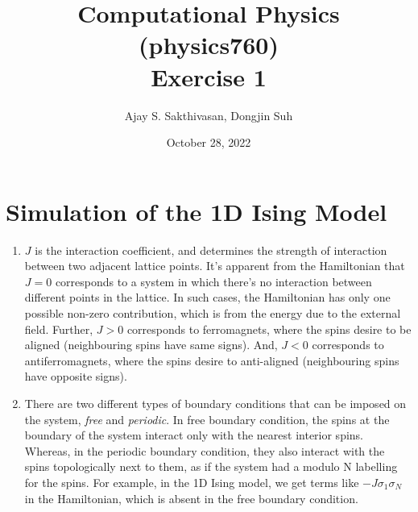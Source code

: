 \documentclass{article}
\title{Computational Physics (physics760) \\ Exercise 1}
\author{Ajay S. Sakthivasan, Dongjin Suh}
\date{October 28, 2022}
\begin{document}
\maketitle

\section{Simulation of the 1D Ising Model}
\begin{enumerate}
    \item $J$ is the interaction coefficient, and determines the strength of interaction between two adjacent lattice points. It's apparent from the Hamiltonian that $J = 0$ corresponds to a system in which there's no interaction between different points in the lattice. In such cases, the Hamiltonian has only one possible non-zero contribution, which is from the energy due to the external field. Further, $J>0$ corresponds to ferromagnets, where the spins desire to be aligned (neighbouring spins have same signs). And, $J<0$ corresponds to antiferromagnets, where the spins desire to anti-aligned (neighbouring spins have opposite signs).
    \item There are two different types of boundary conditions that can be imposed on the system, \textit{free} and \textit{periodic}. In free boundary condition, the spins at the boundary of the system interact only with the nearest interior spins. Whereas, in the periodic boundary condition, they also interact with the spins topologically next to them, as if the system had a modulo N labelling for the spins. For example, in the 1D Ising model, we get terms like $-J\sigma_1\sigma_N$ in the Hamiltonian, which is absent in the free boundary condition.
\end{enumerate}
\end{document}
